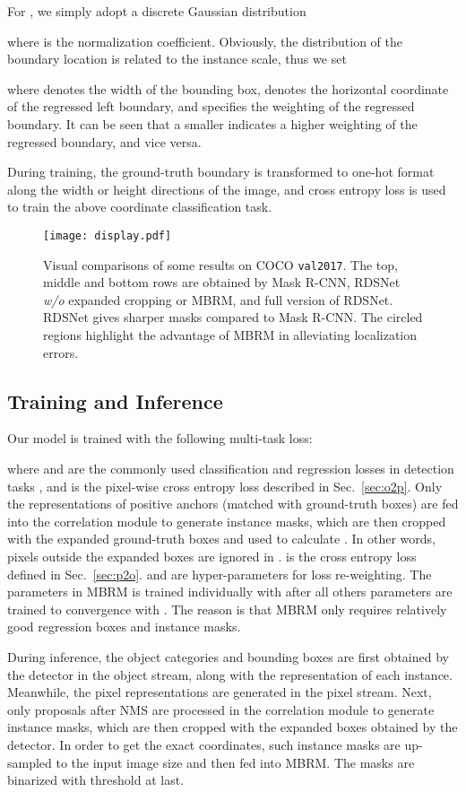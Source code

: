 \documentclass[letterpaper]{article} \usepackage{aaai20}  \usepackage{times}  \usepackage{helvet} \usepackage{courier}  \usepackage[hyphens]{url}  \usepackage{graphicx} \urlstyle{rm} \def\UrlFont{\rm}  \usepackage{graphicx}  \frenchspacing  \setlength{\pdfpagewidth}{8.5in}  \setlength{\pdfpageheight}{11in}
\begin{document}
For , we simply adopt a discrete Gaussian distribution

where  is the normalization coefficient. 
 Obviously, the distribution of the boundary location is related to the instance scale, thus we set

where  denotes the width of the bounding box,  denotes the horizontal coordinate of the regressed left boundary, and  specifies the weighting of the regressed boundary. It can be seen that a smaller  indicates a higher weighting of the regressed boundary, and vice versa.

During training, the ground-truth boundary is transformed to one-hot format along the width or height directions of the image, and cross entropy loss is used to train the above coordinate classification task.

\begin{figure}[t]
    \centering
    \texttt{[image: display.pdf]}
    \caption{Visual comparisons of some results on COCO \texttt{val2017}. The top, middle and bottom rows are obtained by Mask R-CNN, RDSNet \textit{w/o} expanded cropping or MBRM, and full version of RDSNet. RDSNet gives sharper masks compared to Mask R-CNN. The circled regions highlight the advantage of MBRM in alleviating localization errors.}
    \label{fig:display}
\end{figure}

\subsection{Training and Inference}
Our model is trained with the following multi-task loss:

where  and  are the commonly used classification and regression losses in detection tasks \cite{ren2015faster,lin2017focal}, and  is the pixel-wise cross entropy loss described in Sec.~\ref{sec:o2p}. Only the representations of positive anchors (matched with ground-truth boxes) are fed into the correlation module to generate instance masks, which are then cropped with the expanded ground-truth boxes and used to calculate . In other words, pixels outside the expanded boxes are ignored in .  is the cross entropy loss defined in Sec.~\ref{sec:p2o}.  and  are hyper-parameters for loss re-weighting. The parameters in MBRM is trained individually with  after all others parameters are trained to convergence with . The reason is that MBRM only requires relatively good regression boxes and instance masks.

During inference, the object categories and bounding boxes are first obtained by the detector in the object stream, along with the representation of each instance. Meanwhile, the pixel representations are generated in the pixel stream. Next, only proposals after NMS are processed in the correlation module to generate instance masks, which are then cropped with the expanded boxes obtained by the detector. In order to get the exact coordinates, such instance masks are up-sampled to the input image size and then fed into MBRM. The masks are binarized with threshold  at last. 
\end{document}
